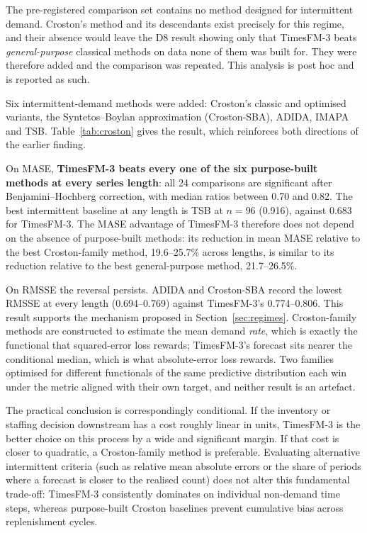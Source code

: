 \documentclass[article]{ajs}
\providecommand{\sectionref}[1]{Section~\ref{#1}}
\providecommand{\tableref}[1]{Table~\ref{#1}}
\begin{document}
The pre-registered comparison set contains no method designed for intermittent demand. Croston's
method \citep{croston1972} and its descendants exist precisely for this regime, and their absence
would leave the D8 result showing only that TimesFM-3 beats \emph{general-purpose} classical
methods on data none of them was built for. They were therefore added and the comparison was repeated.
This analysis is post hoc and is reported as such.

Six intermittent-demand methods were added: Croston's classic and optimised variants, the
Syntetos--Boylan approximation (Croston-SBA), ADIDA, IMAPA and TSB. \tableref{tab:croston} gives
the result, which reinforces both directions of the earlier finding.



On MASE, \textbf{TimesFM-3 beats every one of the six purpose-built methods at every series
length}: all 24 comparisons are significant after Benjamini--Hochberg correction, with median
ratios between 0.70 and 0.82. The best intermittent baseline at any length is TSB at $n = 96$
(0.916), against 0.683 for TimesFM-3. The MASE advantage of TimesFM-3 therefore does
not depend on the absence of purpose-built methods: its reduction in mean MASE relative to the best
Croston-family method, 19.6--25.7\% across lengths, is similar to its reduction relative to the
best general-purpose method, 21.7--26.5\%.

On RMSSE the reversal persists. ADIDA and Croston-SBA record the
lowest RMSSE at every length (0.694--0.769) against TimesFM-3's 0.774--0.806. This result
supports the mechanism proposed in \sectionref{sec:regimes}. Croston-family methods are
constructed to estimate the mean demand \emph{rate}, which is exactly the functional that
squared-error loss rewards; TimesFM-3's forecast sits nearer the conditional median, which is
what absolute-error loss rewards. Two families optimised for different functionals of the same
predictive distribution each win under the metric aligned with their own target, and neither
result is an artefact.

The practical conclusion is correspondingly conditional. If the inventory or staffing decision
downstream has a cost roughly linear in units, TimesFM-3 is the better choice on this process by
a wide and significant margin. If that cost is closer to quadratic, a Croston-family method is
preferable. Evaluating alternative intermittent criteria (such as relative mean absolute errors
or the share of periods where a forecast is closer to the realised count) does not alter this
fundamental trade-off: TimesFM-3 consistently dominates on individual non-demand time steps,
whereas purpose-built Croston baselines prevent cumulative bias across replenishment cycles.
\end{document}
